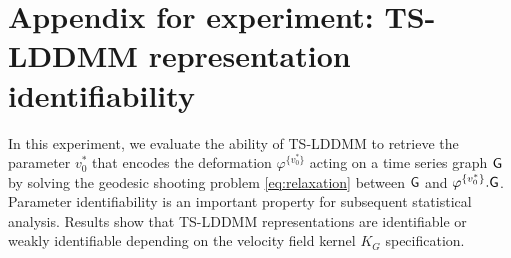 \begin{table}[hbt!]
  \centering
  \caption{UCR/UEA shape-based time series datasets for classification.}
  \label{appendix:table:datasets}
\end{table}

\section{Appendix for experiment: TS-LDDMM representation identifiability}
\label{appendix: identifiability}
In this experiment, we evaluate the ability of TS-LDDMM to retrieve the parameter $v_0^*$ that encodes the deformation $\varphi^{\{v_0^*\}}$ acting on a time series graph $\mathsf{G}$ by solving the geodesic shooting problem \eqref{eq:relaxation} between $\mathsf{G}$ and $\varphi^{\{v_0^*\}}.\mathsf{G}$. Parameter identifiability is an important property for subsequent statistical analysis. Results show that TS-LDDMM representations are identifiable or weakly identifiable depending on the velocity field kernel $K_G$ specification.

